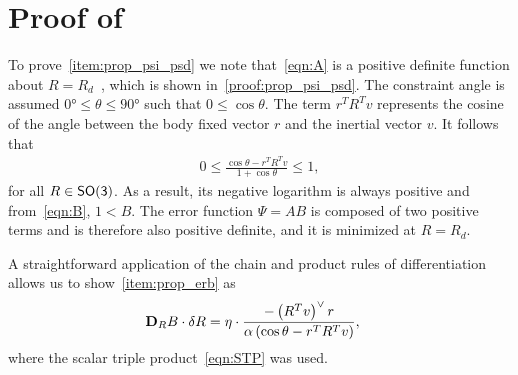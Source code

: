\section{Proof of~}\label{proof:repulsive_configuration_error}
To prove~\cref{item:prop_psi_psd} we note that~\cref{eqn:A} is a positive definite function about \( R = R_d \)~\cite{bullo2004}, which is shown in~\cref{proof:prop_psi_psd}.
The constraint angle is assumed \( \ang{0} \leq \theta \leq \ang{90} \) such that \( 0 \leq \cos \theta \).
The term \( r^T R^T v \) represents the cosine of the angle between the body fixed vector \( r \) and the inertial vector \( v \). 
It follows that
\begin{align*}
	0 \leq  \frac{\cos \theta -  r^T R^T v}{1 + \cos \theta} \leq 1 ,
\end{align*}
for all \( R \in \mathsf{SO(3)} \). 
As a result, its negative logarithm is always positive and from~\cref{eqn:B}, \(1 < B\).
The error function \( \Psi = A B \) is composed of two positive terms and is therefore also positive definite, and it is minimized at \( R = R_d \).

A straightforward application of the chain and product rules of differentiation allows us to show~\cref{item:prop_erb} as
\begin{align*}
	\mathbf{D}_{R} B \cdot \delta R &=  \eta \cdot \frac{- \left( R^T v\right)^\vee r}{\alpha \left(\cos \theta - r^T R^T v \right)} ,
\end{align*}
where the scalar triple product~\cref{eqn:STP} was used.

